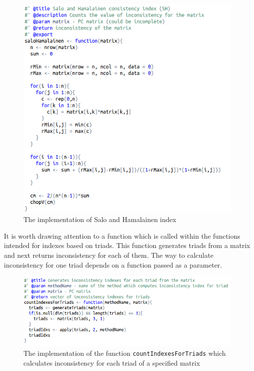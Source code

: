 \begin{figure}[!]
\centerline{\includegraphics[scale=0.75]{images/kod4.png}}
\caption{The implementation of Salo and Hamalainen index}
\end{figure}
It is worth drawing attention to a function which is called within the functions intended for indexes based on triads. This function generates triads from a matrix and next returns inconsistency for each of them. The way to calculate inconsistency for one triad depends on a function passed as a parameter.

\begin{figure}[!]
\centerline{\includegraphics[scale=0.75]{images/kod5.png}}
\caption{The implementation of the function \texttt{countIndexesForTriads} which calculates inconsistency for each triad of a specified matrix}
\end{figure}

